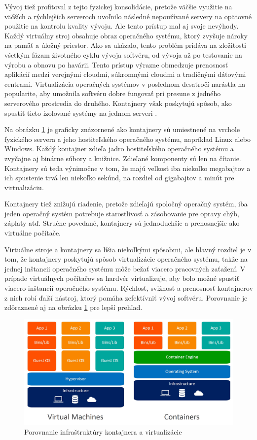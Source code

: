 Vývoj tiež profitoval z tejto fyzickej konsolidácie, pretože väčšie využitie na väčších a rýchlejších serveroch uvoľnilo následné nepoužívané servery na opätovné použitie na kontrolu kvality vývoju. Ale tento prístup mal aj svoje nevýhody. Každý virtuálny stroj obsahuje obraz operačného systému, ktorý zvyšuje nároky na pamäť a úložný priestor. Ako sa ukázalo, tento problém pridáva na zložitosti všetkým fázam životného cyklu vývoja softvéru, od vývoja až po testovanie na výrobu a obnovu po havárii. Tento prístup výrazne obmedzuje prenosnosť aplikácií medzi verejnými cloudmi, súkromnými cloudmi a tradičnými dátovými centrami. Virtualizácia operačných systémov v poslednom desaťročí narástla na popularite, aby umožnila softvéru dobre fungovať pri presune z jedného serverového prostredia do druhého. Kontajnery však poskytujú spôsob, ako spustiť tieto izolované systémy na jednom serveri \cite{containersvsvirtual2}.

Na obrázku \ref{kontaj} je graficky znázornené ako kontajnery sú umiestnené na vrchole fyzického servera a jeho hostiteľského operačného systému, napríklad Linux alebo Windows. Každý kontajner zdieľa jadro hostiteľského operačného systému a zvyčajne aj binárne súbory a knižnice. Zdieľané komponenty sú len na čítanie. Kontajnery sú teda výnimočne v tom, že majú veľkosť iba niekoľko megabajtov a ich spustenie trvá len niekoľko sekúnd, na rozdiel od gigabajtov a minút pre virtualizáciu.

Kontajnery tiež znižujú riadenie, pretože zdieľajú spoločný operačný systém, iba jeden operačný systém potrebuje starostlivosť a zásobovanie pre opravy chýb, záplaty atď. Stručne povedané, kontajnery sú jednoduchšie a prenosnejšie ako virtuálne počítače.

Virtuálne stroje a kontajnery sa líšia niekoľkými spôsobmi, ale hlavný rozdiel je v tom, že kontajnery poskytujú spôsob virtualizácie operačného systému, takže na jednej inštancii operačného systému môže bežať viacero pracovných zaťažení. V prípade virtuálnych počítačov sa hardvér virtualizuje, aby bolo možné spustiť viacero inštancií operačného systému. Rýchlosť, svižnosť a prenosnosť kontajnerov z nich robí ďalší nástroj, ktorý pomáha zefektívniť vývoj softvéru. Porovnanie je zdôraznené aj na obrázku \ref{kontaj} pre lepší prehľad.

\begin{figure}[!h]
    \centering
    \includegraphics[width=1\linewidth]{figures/containervsvirtual}
    \caption{Porovnanie infraštruktúry kontajnera a virtualizácie \cite{containervsvirtual}}
	\label{kontaj}
\end{figure}

